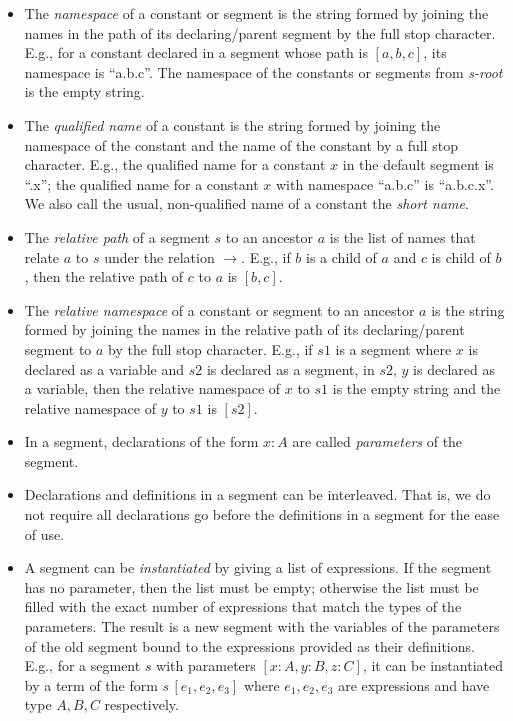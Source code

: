 \begin{definition}[Segment]
\begin{itemize}
  \item The \emph{namespace} of a constant or segment is the string formed by joining the names in the path of its declaring/parent segment by the full stop character. E.g., for a constant declared in a segment whose path is $[a,b,c]$, its namespace is ``a.b.c''. The namespace of the constants or segments from \emph{s-root} is the empty string.
  \item The \emph{qualified name} of a constant is the string formed by joining the namespace of the constant and the name of the constant by a full stop character. E.g., the qualified name for a constant $x$ in the default segment is ``.x''; the qualified name for a constant $x$ with namespace ``a.b.c'' is ``a.b.c.x''. We also call the usual, non-qualified name of a constant the \emph{short name}.
  \item The \emph{relative path} of a segment $s$ to an ancestor $a$ is the list of names that relate $a$ to $s$ under the relation $\to$. E.g., if $b$ is a child of $a$ and $c$ is child of $b$, then the relative path of $c$ to $a$ is $[b,c]$.  
  \item The \emph{relative namespace} of a constant or segment to an ancestor $a$ is the string formed by joining the names in the relative path of its declaring/parent segment to $a$ by the full stop character. E.g., if $s1$ is a segment where $x$ is declared as a variable and $s2$ is declared as a segment, in $s2$, $y$ is declared as a variable, then the relative namespace of $x$ to $s1$ is the empty string and the relative namespace of $y$ to $s1$ is $[s2]$.
  \item In a segment, declarations of the form $x : A$ are called \emph{parameters} of the segment.
  \item Declarations and definitions in a segment can be interleaved. That is, we do not require all declarations go before the definitions in a segment for the ease of use.
  \item A segment can be \emph{instantiated} by giving a list of expressions. If the segment has no parameter, then the list must be empty; otherwise the list must be filled with the exact number of expressions that match the types of the parameters. The result is a new segment with the variables of the parameters of the old segment bound to the expressions provided as their definitions. E.g., for a segment $s$ with parameters $[x : A, y : B, z : C]$, it can be instantiated by a term of the form $s\,[e_1, e_2, e_3]$ where $e_1, e_2, e_3$ are expressions and have type $A, B, C$ respectively.

\end{itemize}
\end{definition}

